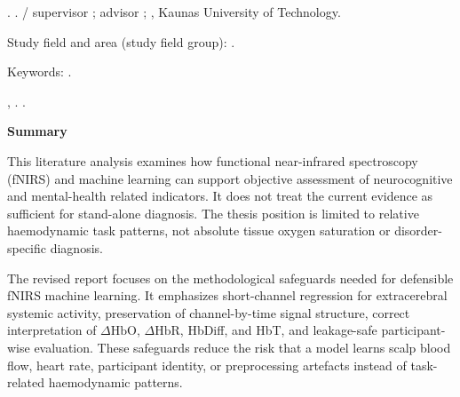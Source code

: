 \begin{titlepage}

\projectAuthorName. \projectTitle. \projectType / supervisor \projectSupervisorNameFirst{}; advisor \projectSupervisorNameSecond{}; \projectFaculty, Kaunas University of Technology.

Study field and area (study field group): \projectStudyFieldAndArea.

Keywords: \projectKeywords.

\projectCity, \projectYear. \pageref{LastPage}.

\begin{center}
  \textbf{Summary}
\end{center}

This literature analysis examines how functional near-infrared spectroscopy (fNIRS) and machine learning can support objective assessment of neurocognitive and mental-health related indicators. It does not treat the current evidence as sufficient for stand-alone diagnosis. The thesis position is limited to relative haemodynamic task patterns, not absolute tissue oxygen saturation or disorder-specific diagnosis.

The revised report focuses on the methodological safeguards needed for defensible fNIRS machine learning. It emphasizes short-channel regression for extracerebral systemic activity, preservation of channel-by-time signal structure, correct interpretation of \(\Delta\mathrm{HbO}\), \(\Delta\mathrm{HbR}\), HbDiff, and HbT, and leakage-safe participant-wise evaluation. These safeguards reduce the risk that a model learns scalp blood flow, heart rate, participant identity, or preprocessing artefacts instead of task-related haemodynamic patterns.

\end{titlepage}




















